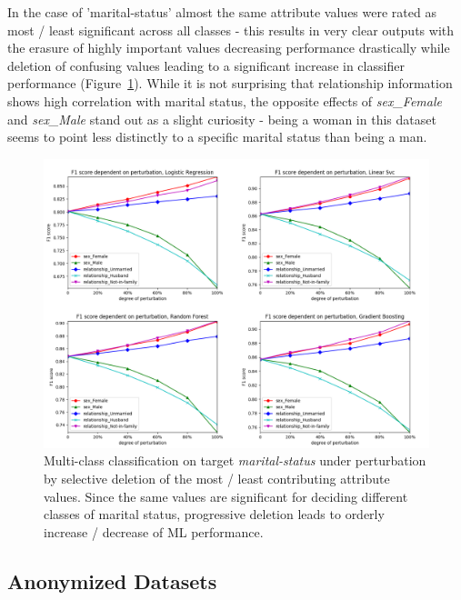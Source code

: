 \documentclass{llncs}
\begin{document}
In the case of 'marital-status' almost the same attribute values were rated as most / least significant across all classes - this results in very clear outputs with the erasure of highly important values decreasing performance drastically while deletion of confusing values leading to a significant increase in classifier performance (Figure~\ref{fig:results_perturbation_marital_status}). While it is not surprising that relationship information shows high correlation with marital status, the opposite effects of \textit{sex\_Female} and \textit{sex\_Male} stand out as a slight curiosity - being a woman in this dataset seems to point less distinctly to a specific marital status than being a man.


\begin{figure}[!h]
	\centering
	\includegraphics[width=1\textwidth]{figures/perturbation/adults_marital_status/perturb_marital_combined}
	\caption{Multi-class classification on target \textit{marital-status} under perturbation by selective deletion of the most / least contributing attribute values. Since the same values are significant for deciding different classes of marital status, progressive deletion leads to orderly increase / decrease of ML performance.}
	\label{fig:results_perturbation_marital_status}
\end{figure}



\subsection{Anonymized Datasets}
\label{ssect:anonymized_ds}
\end{document}
